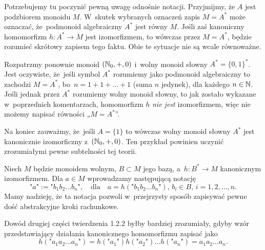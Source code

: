 \documentclass[a4paper,11pt]{article}
\begin{document}
 Potrzebujemy tu poczynić pewną uwagę odnośnie notacji.
Przyjmijmy, że $A$ jest podzbiorem monoidu $M$. W~skutek wybranych
oznaczeń zapis $M = A^{ * }$ może oznaczać, że~podmonoid algebraiczny
$A^{ * }$ jest równy $M$. Jeśli zaś kanoniczny homomorfizm
$h : A^{ * } \to M$ jest izomorfizmem, to wówczas przez $M = A^{ * }$,
będzie rozumieć skrótowy zapisem tego faktu. Obie te sytuacje nie są
wcale równoważne.

Rozpatrzmy ponownie monoid $( \mathbb{N}_{ 0 }, +, 0 )$ i~wolny monoid
słowny $A^{ * } = \{ 0, 1 \}^{ * }$. Jest oczywiste, że~jeśli symbol
$A^{ * }$ rozumiemy jako podmonoid algebraiczny to zachodzi
$M = A^{ * }$, bo~$n = 1 + 1 + \ldots + 1$ (suma $n$ jedynek), dla
każdego $n \in \mathbb{N}$. Jeśli jednak przez $A^{ * }$ rozumiemy wolny
monoid słowny, to jak zostało wykazane w~poprzednich komentarzach,
homomorfizm $h$ \textit{nie jest} izomorfizmem, więc nie możemy
napisać równości „$M = A^{ * }$”.

Na koniec zauważmy, że~jeśli $A = \{ 1 \}$ to wówczas wolny monoid
słowny $A^{ * }$ jest kanonicznie izomorficzny
z~$( \mathbb{N}_{ 0 }, +, 0)$. Ten przykład powinien uczynić zrozumiałymi
pewne subtelności tej teorii.

\vspace{\spaceFour}





 Niech $M$ będzie monoidem wolnym, $B \subset M$ jego bazą,
a~$h : B^{ * } \to M$ kanonicznym izomorfizmem. Dla $a \in M$
wprowadzamy następującą notację
\begin{equation}
  \label{eq:Forys-Forys-22}
  \texttt{"} a \texttt{"} :=
  \texttt{"} b_{ 1 } b_{ 2 } \ldots b_{ n } \texttt{"}, \quad
  \textrm{dla} \quad
  a = h( \texttt{"} b_{ 1 } b_{ 2 } \ldots b_{ n } \texttt{"} ), \,
  b_{ i } \in B,\, i = 1, 2, \ldots, n.
\end{equation}
Mamy nadzieję, że ta notacja pozwoli w~przejrzysty sposób zapisywać
pewne dość abstrakcyjne kroki rachunkowe.

\vspace{\spaceFour}





 Dowód drugiej części twierdzenia 1.2.2 byłby bardziej zrozumiały,
gdyby wzór przedstawiający działania kanonicznego homomorfizmu zapisać jako
\begin{equation}
  \label{eq:Forys-Forys-23}
  h( \texttt{"} a_{ 1 } a_{ 2 } \ldots a_{ n } \texttt{"} ) =
  h( \texttt{"} a_{ 1 } \texttt{"} ) h( \texttt{"} a_{ 2 } \texttt{"} ) \ldots
  h( \texttt{"} a_{ n } \texttt{"} ) = a_{ 1 } a_{ 2 } \ldots a_{ n }.
\end{equation}
\end{document}
